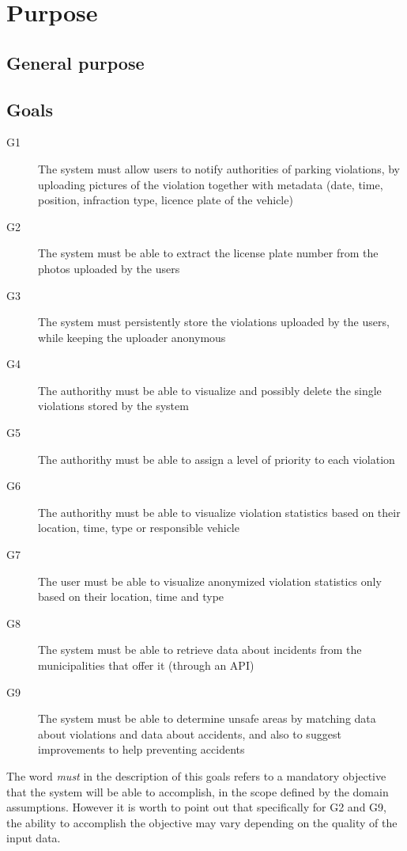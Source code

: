 \section{Purpose}

\subsection{General purpose}


\subsection{Goals}

\begin{description}
    \item[G1] The system must allow users to notify authorities of
    parking violations, by uploading pictures of the violation
    together with metadata
    (date, time, position, infraction type, licence plate of the vehicle)
    \item[G2] The system must be able to extract the license plate number
    from the photos uploaded by the users
    \item[G3] The system must persistently store the violations
    uploaded by the users, while keeping the uploader anonymous
    \item[G4] The authorithy must be able to visualize and possibly delete 
    the single violations stored by the system
    \item[G5] The authorithy must be able to assign a level of priority
    to each violation
    \item[G6] The authorithy must be able to visualize violation statistics
    based on their location, time, type or responsible vehicle
    \item[G7] The user must be able to visualize anonymized violation
    statistics only based on their location, time and type
    \item[G8] The system must be able to retrieve data about incidents
    from the municipalities that offer it (through an API)
    \item[G9] The system must be able to determine unsafe areas by
    matching data about violations and data about accidents, and also
    to suggest improvements to help preventing accidents      
\end{description}

\noindent
The word \emph{must} in the description of this goals refers to a mandatory
objective that the system will be able to accomplish, in the scope defined
by the domain assumptions.
However it is worth to point out that specifically for G2 and G9,
the ability to accomplish the objective may vary depending on the
quality of the input data.